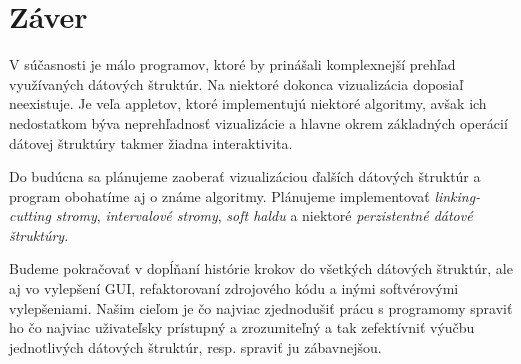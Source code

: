 \section{Záver}

V súčasnosti je málo programov, ktoré by prinášali komplexnejší prehľad 
využívaných dátových štruktúr. Na niektoré dokonca vizualizácia doposiaľ 
neexistuje. Je veľa appletov, ktoré implementujú niektoré algoritmy, avšak 
ich nedostatkom býva neprehľadnosť vizualizácie a hlavne okrem základných 
operácií dátovej štruktúry takmer žiadna interaktivita. 

Do budúcna sa plánujeme zaoberať vizualizáciou ďalších dátových 
štruktúr a program obohatíme aj o známe algoritmy. Plánujeme implementovať 
\emph{linking-cutting stromy}, \emph{intervalové stromy}, \emph{soft haldu} 
a niektoré \emph{perzistentné dátové štruktúry}.

Budeme pokračovať v 
dopĺňaní histórie krokov do všetkých dátových štruktúr, ale aj vo vylepšení 
GUI, refaktorovaní zdrojového kódu a inými softvérovými vylepšeniami. Našim 
cieľom je čo najviac zjednodušiť prácu s programomy spraviť ho čo najviac 
uživateľsky prístupný a zrozumiteľný a tak zefektívniť výučbu 
jednotlivých dátových štruktúr, resp. spraviť ju zábavnejšou.
